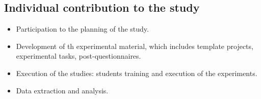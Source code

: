 \subsection{Individual contribution to the study}
\begin{itemize}
    \item Participation to the planning of the study.
    \item Development of th experimental material, which includes template projects, experimental tasks, post-questionnaires.
    \item Execution of the studies: students training and execution of the experiments.
    \item Data extraction and analysis.
\end{itemize}